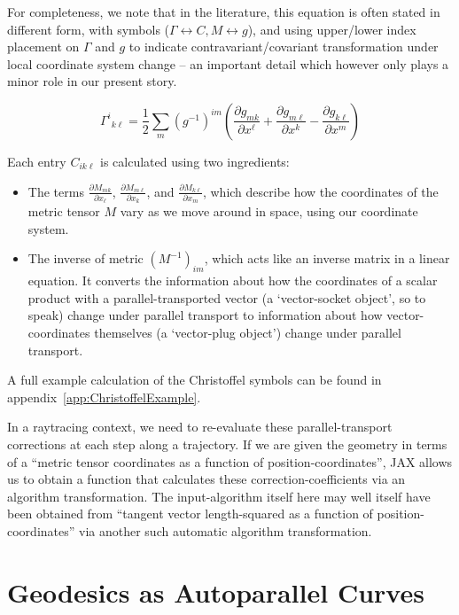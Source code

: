 \documentclass[twocolumn]{article}
\providecommand{\tightlist}{%
   \setlength{\itemsep}{0pt}\setlength{\parskip}{0pt}}
\begin{document}
For completeness, we note that in the literature, this equation is
often stated in different form, with symbols ($\Gamma\leftrightarrow
C, M\leftrightarrow g$), and using upper/lower index placement on
$\Gamma$ and $g$ to indicate contravariant/covariant transformation
under local coordinate system change -- an important detail which
however only plays a minor role in our present story.

\begin{equation}\Gamma^i{}_{k\ell} = \frac{1}{2} \sum_m (g^{-1})^{im} \left( \frac{\partial g_{mk}}{\partial x^\ell} + \frac{\partial g_{m\ell}}{\partial x^k} - \frac{\partial g_{k\ell}}{\partial x^m} \right)\end{equation}

Each entry \(C_{ik\ell}\) is calculated using two ingredients:

\begin{itemize}
\tightlist
\item
  The terms \(\frac{\partial M_{mk}}{\partial x_{\ell}}\),
  \(\frac{\partial M_{m\ell}}{\partial x_{k}}\), and
  \(\frac{\partial M_{k\ell}}{\partial x_{m}}\), which describe how the
  coordinates of the metric tensor \(M\) vary as we move around in space,
  using our coordinate system.
\item
  The inverse of metric \((M^{-1})_{im}\), which acts like an inverse
  matrix in a linear equation. It converts the information about how the
  coordinates of a scalar product with a parallel-transported vector
  (a `vector-socket object', so to speak)
  change under parallel transport to information about how vector-coordinates
  themselves (a `vector-plug object') change under parallel transport.
\end{itemize}

A full example calculation of the Christoffel symbols can be found in
appendix~\ref{app:ChristoffelExample}.

In a raytracing context, we need to re-evaluate these
parallel-transport corrections at each step along a trajectory. If we
are given the geometry in terms of a ``metric tensor coordinates as a
function of position-coordinates'', JAX allows us to obtain a function
that calculates these correction-coefficients via an algorithm
transformation. The input-algorithm itself here may well itself have
been obtained from ``tangent vector length-squared as a function of
position-coordinates'' via another such automatic algorithm transformation.


\section{Geodesics as Autoparallel Curves}\label{sec:geodesics}
\end{document}
